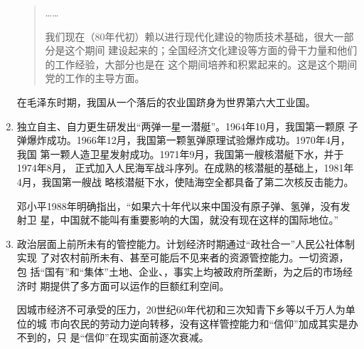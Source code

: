 \begin{enumerate}
\begin{quotation}
    ……

    我们现在（80年代初）赖以进行现代化建设的物质技术基础，很大一部分是这个期间
    建设起来的；全国经济文化建设等方面的骨干力量和他们的工作经验，大部分也是在
    这个期间培养和积累起来的。这是这个期间党的工作的主导方面。
  \end{quotation}

  在毛泽东时期，我国从一个落后的农业国跻身为世界第六大工业国。

\item 独立自主、自力更生研发出“两弹一星一潜艇”。1964年10月，我国第一颗原
  子弹爆炸成功。1966年12月，我国第一颗氢弹原理试验爆炸成功。1970年4月，我国
  第一颗人造卫星发射成功。1971年9月，我国第一艘核潜艇下水，并于1974年8月，
  正式加入人民海军战斗序列。在成熟的核潜艇的基础上，1981年4月，我国第一艘战
  略核潜艇下水，使陆海空全都具备了第二次核反击能力。

  邓小平1988年明确指出，“如果六十年代以来中国没有原子弹、氢弹，没有发射卫
  星，中国就不能叫有重要影响的大国，就没有现在这样的国际地位。”

\item 政治层面上前所未有的管控能力。计划经济时期通过“政社合一”人民公社体制实现
  了对农村前所未有、甚至可能后不见来者的资源管控能力。一切资源，包
  括“国有”和“集体”土地、企业、，事实上均被政府所垄断，为之后的市场经济时
  期提供了多方面可以运作的巨额红利空间。

  因城市经济不可承受的压力，20世纪60年代初和三次知青下乡等以千万人为单位的城
  市向农民的劳动力逆向转移，没有这样管控能力和“信仰”加成其实是办不到的，只
  是“信仰”在现实面前逐次衰减。
\end{enumerate}
